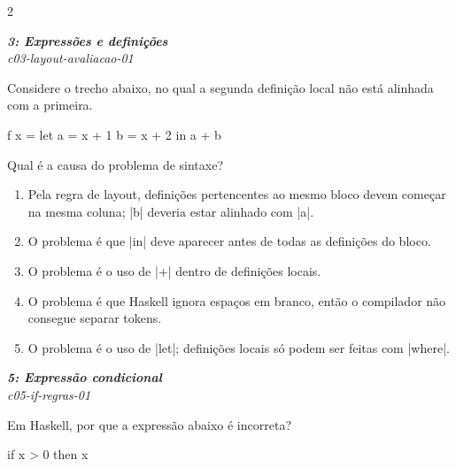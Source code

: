 \documentclass[a4paper,10pt,brazil]{article}
\begin{document}
\begin{multicols}{2}
\begin{enumerate}
\end{enumerate}

\begin{flushright}
  \footnotesize
  \textit{\textbf{3: Expressões e definições}}\\
  \textit{c03-layout-avaliacao-01}\\

\end{flushright}
Considere o trecho abaixo, no qual a segunda definição local não está alinhada com a primeira.

\begin{haskellcode}
f x = let a = x + 1
        b = x + 2
      in a + b
\end{haskellcode}

Qual é a causa do problema de sintaxe?

\begin{enumerate}
  \item Pela regra de layout, definições pertencentes ao mesmo bloco devem começar na mesma coluna; \haskellinline|b| deveria estar alinhado com \haskellinline|a|.

  \item O problema é que \haskellinline|in| deve aparecer antes de todas as definições do bloco.

  \item O problema é o uso de \haskellinline|+| dentro de definições locais.

  \item O problema é que Haskell ignora espaços em branco, então o compilador não consegue separar tokens.

  \item O problema é o uso de \haskellinline|let|; definições locais só podem ser feitas com \haskellinline|where|.


\end{enumerate}

\begin{flushright}
  \footnotesize
  \textit{\textbf{5: Expressão condicional}}\\
  \textit{c05-if-regras-01}\\

\end{flushright}
Em Haskell, por que a expressão abaixo é incorreta?
\begin{haskellcode}
if x > 0 then x
\end{haskellcode}


\end{multicols}
\end{document}
